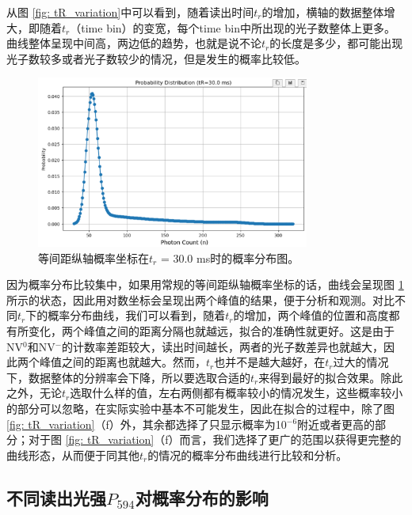 \documentclass[type = bachelor]{whu-thesis}
\begin{document}
从图 \ref{fig: tR_variation}中可以看到，随着读出时间$t_r$的增加，横轴的数据整体增大，即随着$t_r$（time bin）的变宽，每个time bin中所出现的光子数整体上更多。曲线整体呈现中间高，两边低的趋势，也就是说不论$t_r$的长度是多少，都可能出现光子数较多或者光子数较少的情况，但是发生的概率比较低。
\begin{figure}
  \centering
  \includegraphics[width=0.8\textwidth]{figures/Chapter 5/tR_isometric.png}
  \caption[等间距纵轴概率坐标在$t_r$ = 30.0 ms时的概率分布图]{等间距纵轴概率坐标在$t_r$ = 30.0 ms时的概率分布图。}
  \label{fig: tR_isometric}
\end{figure}
因为概率分布比较集中，如果用常规的等间距纵轴概率坐标的话，曲线会呈现图 \ref{fig: tR_isometric}所示的状态，因此用对数坐标会呈现出两个峰值的结果，便于分析和观测。对比不同$t_r$下的概率分布曲线，我们可以看到，随着$t_r$的增加，两个峰值的位置和高度都有所变化，两个峰值之间的距离分隔也就越远，拟合的准确性就更好。这是由于NV$^0$和NV$^-$的计数率差距较大，读出时间越长，两者的光子数差异也就越大，因此两个峰值之间的距离也就越大。然而，$t_r$也并不是越大越好，在$t_r$过大的情况下，数据整体的分辨率会下降，所以要选取合适的$t_r$来得到最好的拟合效果。除此之外，无论$t_r$选取什么样的值，左右两侧都有概率较小的情况发生，这些概率较小的部分可以忽略，在实际实验中基本不可能发生，因此在拟合的过程中，除了图 \ref{fig: tR_variation}（f）外，其余都选择了只显示概率为10$^{-6}$附近或者更高的部分；对于图 \ref{fig: tR_variation}（f）而言，我们选择了更广的范围以获得更完整的曲线形态，从而便于同其他$t_r$的情况的概率分布曲线进行比较和分析。

\subsection{不同读出光强$P_{594}$对概率分布的影响}
\end{document}

